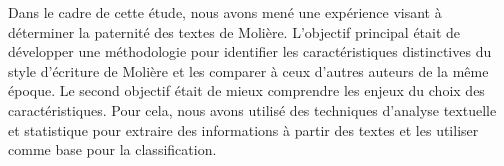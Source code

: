 \vspace{\baselineskip}
\hspace{0,5cm}Dans le cadre de cette étude, nous avons mené une expérience visant à déterminer
la paternité des textes de Molière. L'objectif principal était de développer une
méthodologie pour identifier les caractéristiques distinctives du style
d'écriture de Molière et les comparer à ceux d'autres auteurs de la même époque.
Le second objectif était de mieux comprendre les enjeux du choix des
caractéristiques.
Pour cela, nous avons utilisé des techniques d'analyse textuelle et statistique
pour extraire des informations à partir des textes et les utiliser comme base
pour la classification. 